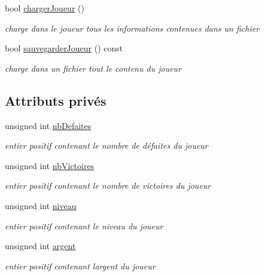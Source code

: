 \begin{DoxyCompactItemize}
bool \hyperlink{class_joueur_a2bf2a581a2e4de27a812e21b360ab9f3}{charger\+Joueur} ()
\begin{DoxyCompactList}\small\item\em charge dans le joueur tous les informations contenues dans un fichier \end{DoxyCompactList}\item 
bool \hyperlink{class_joueur_a0bf50be14471ba0c0944b31c70bf6ad3}{sauvegarder\+Joueur} () const
\begin{DoxyCompactList}\small\item\em charge dans un fichier tout le contenu du joueur \end{DoxyCompactList}\end{DoxyCompactItemize}
\subsection*{Attributs privés}
\begin{DoxyCompactItemize}
\item 
\mbox{\label{class_joueur_afdef85975e261b9b315e4629c5f75817}} 
unsigned int \hyperlink{class_joueur_afdef85975e261b9b315e4629c5f75817}{nb\+Defaites}
\begin{DoxyCompactList}\small\item\em entier positif contenant le nombre de défaites du joueur \end{DoxyCompactList}\item 
\mbox{\label{class_joueur_a64c3df68468d8c3a08ebeae05c144d7f}} 
unsigned int \hyperlink{class_joueur_a64c3df68468d8c3a08ebeae05c144d7f}{nb\+Victoires}
\begin{DoxyCompactList}\small\item\em entier positif contenant le nombre de victoires du joueur \end{DoxyCompactList}\item 
\mbox{\label{class_joueur_a094214899e05a45eb3807b9874fbdf66}} 
unsigned int \hyperlink{class_joueur_a094214899e05a45eb3807b9874fbdf66}{niveau}
\begin{DoxyCompactList}\small\item\em entier positif contenant le niveau du joueur \end{DoxyCompactList}\item 
\mbox{\label{class_joueur_a591be8b0a344a918d728f12fefd08005}} 
unsigned int \hyperlink{class_joueur_a591be8b0a344a918d728f12fefd08005}{argent}
\begin{DoxyCompactList}\small\item\em entier positif contenant l\textquotesingle{}argent du joueur \end{DoxyCompactList}\end{DoxyCompactItemize}


